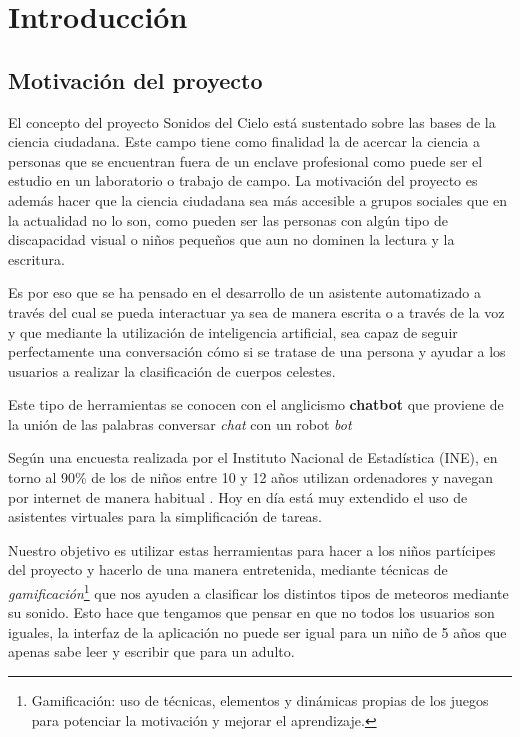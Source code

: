 \chapter{Introducción}
\section{Motivación del proyecto}

El concepto del proyecto Sonidos del Cielo está sustentado sobre las bases de la ciencia ciudadana. Este campo tiene como finalidad la de acercar la ciencia a personas que se encuentran fuera de un enclave profesional como puede ser el estudio en un laboratorio o trabajo de campo. La motivación del proyecto es además hacer que la ciencia ciudadana sea más accesible a grupos sociales que en la actualidad no lo son, como pueden ser las personas con algún tipo de discapacidad visual o niños pequeños que aun no dominen la lectura y la escritura.

Es por eso que se ha pensado en el desarrollo de un asistente automatizado a través del cual se pueda interactuar ya sea de manera escrita o a través de la voz y que mediante la utilización de inteligencia artificial, sea capaz de seguir perfectamente una conversación cómo si se tratase de una persona y ayudar a los usuarios a realizar la clasificación de cuerpos celestes. 

Este tipo de herramientas se conocen con el anglicismo \textbf{chatbot} que proviene de la unión de las palabras conversar \textit{chat} con un robot \textit{bot}

Según una encuesta realizada por el Instituto Nacional de Estadística (INE), en torno al 90\% de los de niños entre 10 y 12 años utilizan ordenadores y navegan por internet de manera habitual \cite{ine}. Hoy en día está muy extendido el uso de asistentes virtuales para la simplificación de tareas. 

Nuestro objetivo es utilizar estas herramientas para hacer a los niños partícipes del proyecto y hacerlo de una manera entretenida, mediante técnicas de \textit{gamificación}\footnote{Gamificación: uso de técnicas, elementos y dinámicas propias de los juegos para potenciar la motivación y mejorar el aprendizaje.} que nos ayuden a clasificar los distintos tipos de meteoros mediante su sonido.
Esto hace que tengamos que pensar en que no todos los usuarios son iguales, la interfaz de la aplicación no puede ser igual para un niño de 5 años que apenas sabe leer y escribir que para un adulto.

